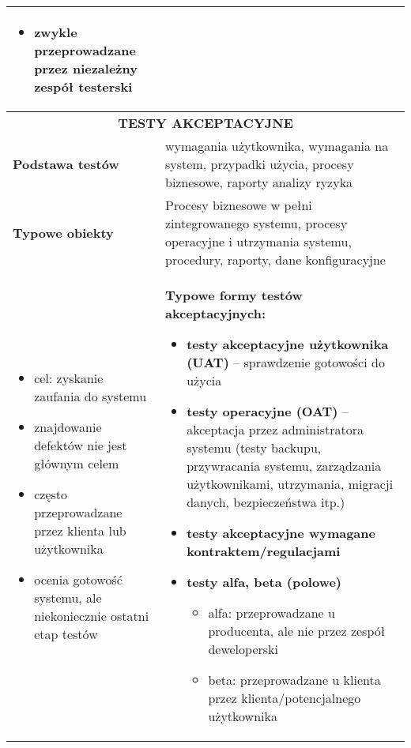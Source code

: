 \documentclass[../main.tex]{subfiles}
\begin{document}
\begin{table}[H]
\begin{center}
\begin{tabular}{| p{8cm}| p{8cm}|}
\begin{itemize}
                    \item zwykle przeprowadzane przez niezależny zespół testerski
                \end{itemize}
                &\\
                \hline
                \hline
                \multicolumn{2}{|c|}{ \textbf{TESTY AKCEPTACYJNE}}\\
                \hline
                \textbf{Podstawa testów} & wymagania użytkownika, wymagania na system,
                przypadki użycia, procesy biznesowe, raporty
                analizy ryzyka\\
                \hline
                \textbf{Typowe obiekty} & Procesy biznesowe w pełni zintegrowanego
                systemu, procesy operacyjne i utrzymania systemu,
                procedury, raporty, dane konfiguracyjne\\
                \hline
                \hline
                \begin{itemize}
                    \item cel: zyskanie zaufania do systemu
                    \item znajdowanie defektów nie jest głównym celem
                    \item często przeprowadzane przez klienta lub użytkownika
                    \item ocenia gotowość systemu, ale niekoniecznie ostatni etap testów
                \end{itemize}
                &
                \textbf{Typowe formy testów akceptacyjnych:}
                \begin{itemize}
                    \item \textbf{testy akceptacyjne użytkownika (UAT)} – sprawdzenie gotowości do użycia
                    \item \textbf{testy operacyjne (OAT)} – akceptacja przez administratora systemu (testy
                    backupu, przywracania systemu, zarządzania użytkownikami, utrzymania,
                    migracji danych, bezpieczeństwa itp.)
                    \item \textbf{testy akceptacyjne wymagane kontraktem/regulacjami}
                    \item \textbf{testy alfa, beta (polowe)}
                    \begin{itemize}
                        \item alfa: przeprowadzane u producenta, ale nie przez zespół deweloperski
                        \item beta: przeprowadzane u klienta przez klienta/potencjalnego użytkownika
                    \end{itemize}
                \end{itemize}\\
                \hline
            \end{tabular}
        \end{center}
    \end{table}
\end{document}
